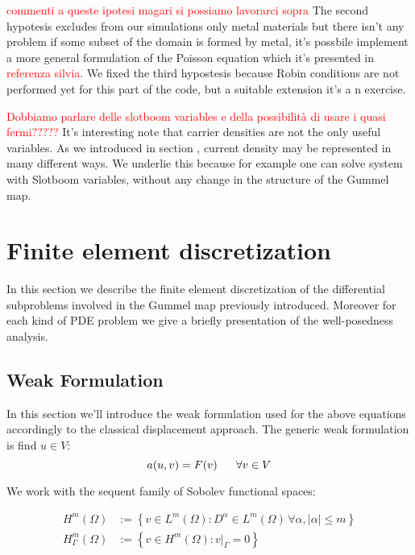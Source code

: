 \textcolor{red}{commenti a queste ipotesi magari si possiamo lavorarci sopra}
The second hypotesis excludes from our simulations only metal materials but there isn't any problem if some subset of the domain is formed by metal, it's possbile implement a more general formulation of the Poisson equation which it's presented in \textcolor{red}{referenza silvia}.
We fixed the third hypostesis because Robin conditions are not performed yet for this part of the code, but a suitable extension it's a n exercise.
 
\textcolor{red}{Dobbiamo parlare delle slotboom variables e della possibilità di usare i quasi fermi?????}
It's interesting note that carrier densities are not the only useful variables. As we introduced in section , current density may be represented in many different ways.  We underlie this because for example one can solve system  with Slotboom variables, without any change in the structure of the Gummel map.


\chapter{Finite element discretization}

In this section we describe the finite element discretization of the differential subproblems involved in the Gummel map previously introduced. Moreover for each kind of PDE problem we give a briefly presentation of the well-posedness analysis. 


\section{Weak Formulation}

In this section we'll introduce the weak formulation used for the above equations accordingly to the classical displacement approach. The generic weak formulation is find $u\in V$:
\begin{equation}
\label{eq: generic weak formulation}
a(u,v) = F(v) \psp{10} \forall v \in V
\end{equation}

We work with the sequent family of Sobolev functional spaces:

\begin{align}
H^m(\Omega) & := \left\{  v \in L^m(\Omega) : D^\alpha \in L^m(\Omega) \, \forall \alpha, |\alpha|\leq m\right\}
\\
H^m_{\Gamma}(\Omega) & := \left\{  v \in H^m(\Omega) : v|_{\Gamma} = 0 \right\}
\end{align} 

